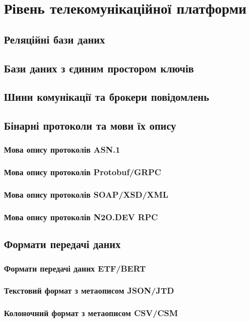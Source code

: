 
\chapter{Рівень телекомунікаційної платформи}

\section{Реляційні бази даних}

\section{Бази даних з єдиним простором ключів}

\section{Шини комунікації та брокери повідомлень}

\section{Бінарні протоколи та мови їх опису}

\subsection{Мова опису протоколів ASN.1}

\subsection{Мова опису протоколів Protobuf/GRPC}

\subsection{Мова опису протоколів SOAP/XSD/XML}

\subsection{Мова опису протоколів N2O.DEV RPC}

\section{Формати передачі даних}

\subsection{Формати передачі даних ETF/BERT}

\subsection{Текстовий формат з метаописом JSON/JTD}

\subsection{Колоночний формат з метаописом CSV/CSM}

